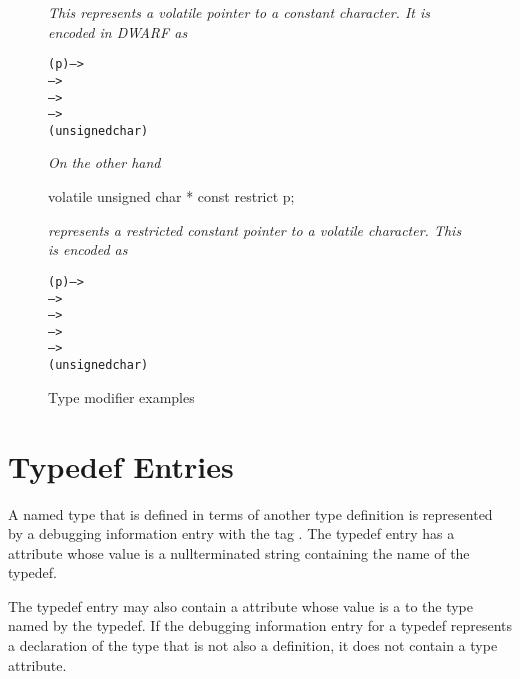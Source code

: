 {\begin{figure}[t]
\textit{This represents a volatile pointer to a constant
character. It is encoded in DWARF as}
\par %
\nolinenumbers
\begin{dwflisting}
\begin{alltt}
        \DWTAGvariable(p) -->
            \DWTAGvolatiletype -->
                \DWTAGpointertype -->
                    \DWTAGconsttype -->
                        \DWTAGbasetype(unsigned char)
\end{alltt}
\end{dwflisting}

\textit{On the other hand}
\begin{nlnlisting}                        
    volatile unsigned char * const restrict p;
\end{nlnlisting}
\textit{represents a restricted constant
pointer to a volatile character. This is encoded as}
\begin{dwflisting}
\begin{alltt}
        \DWTAGvariable(p) -->
            \DWTAGrestricttype -->
                \DWTAGconsttype -->
                    \DWTAGpointertype -->
                        \DWTAGvolatiletype -->
                            \DWTAGbasetype(unsigned char)
\end{alltt}
\end{dwflisting}

\caption{Type modifier examples}
\label{fig:typemidifierexamples}
\end{figure}

\section{Typedef Entries}
\label{chap:typedefentries}
A named type that is defined in terms of another type
definition is represented by a debugging information entry with
the tag \DWTAGtypedefTARG. 
The typedef entry has a \DWATname{} attribute 
whose value is a null\dash terminated string containing
the name of the typedef.

The typedef entry may also contain 
a 
\DWATtype{} attribute whose
value is a  
to the type named by the typedef. If
the debugging information entry for a typedef represents
a declaration of the type that is not also a definition,
it does not contain a type attribute.

}
